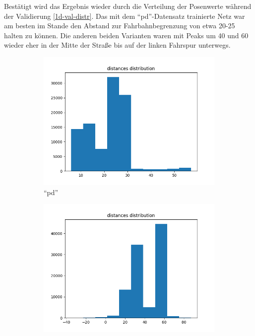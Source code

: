 Bestätigt wird das Ergebnis wieder durch die Verteilung der Posenwerte während der Validierung \ref{1d-val-distr}. Das mit dem ``\acs{pd}''-Datensatz trainierte Netz war am besten im Stande den Abstand zur Fahrbahnbegrenzung von etwa 20-25 halten zu können. Die anderen beiden Varianten waren mit Peaks um 40 und 60 wieder eher in der Mitte der Straße bis auf der linken Fahrspur unterwegs.

\begin{figure}[H]
	\centering
	\begin{subfigure}[h]{0.3\textwidth}
		\centering
		\includegraphics[width=\linewidth]{kapitel5/images/eval/d-only/pd-distr.png}
		\caption{``\acs{pd}''}
		\label{1d-pd-val-distr}
	\end{subfigure}%
	\begin{subfigure}[h]{0.3\textwidth}
		\centering
		\includegraphics[width=\linewidth]{kapitel5/images/eval/d-only/pd-rand-distr.png}

\end{subfigure}
\end{figure}
